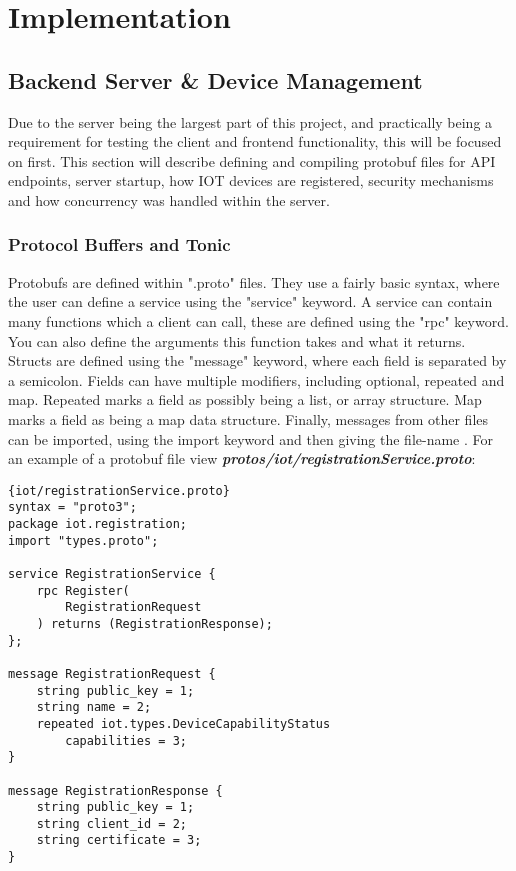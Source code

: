 \chapter{Implementation} \label{cha:implementation}

\section{Backend Server \& Device Management} \label{sec:chapimpl:server}
Due to the server being the largest part of this project, and practically being a requirement for testing the client and frontend functionality, this will be focused on first. This section will describe defining and compiling protobuf files for API endpoints, server startup, how IOT devices are registered, security mechanisms and how concurrency was handled within the server. 

\subsection{Protocol Buffers and Tonic} \label{sec:chapdesign:server:protoBufs}
Protobufs are defined within ".proto" files. They use a fairly basic syntax, where the user can define a service using the "service" keyword. A service can contain many functions which a client can call, these are defined using the "rpc" keyword. You can also define the arguments this function takes and what it returns. Structs are defined using the "message" keyword, where each field is separated by a semicolon. Fields can have multiple modifiers, including optional, repeated and map. Repeated marks a field as possibly being a list, or array structure. Map marks a field as being a map data structure. Finally, messages from other files can be imported, using the import keyword and then giving the file-name \cite{protobufDocs}. For an example of a protobuf file view \textbf{\textit{protos/iot/registrationService.proto}}:

\begin{lstlisting}[language=protobuf3, style=boxed]{iot/registrationService.proto}
syntax = "proto3";
package iot.registration;
import "types.proto";

service RegistrationService {
    rpc Register(
        RegistrationRequest
    ) returns (RegistrationResponse);
};

message RegistrationRequest {
    string public_key = 1;
    string name = 2;
    repeated iot.types.DeviceCapabilityStatus 
        capabilities = 3;
}

message RegistrationResponse {
    string public_key = 1;
    string client_id = 2;
    string certificate = 3;
}
\end{lstlisting}

